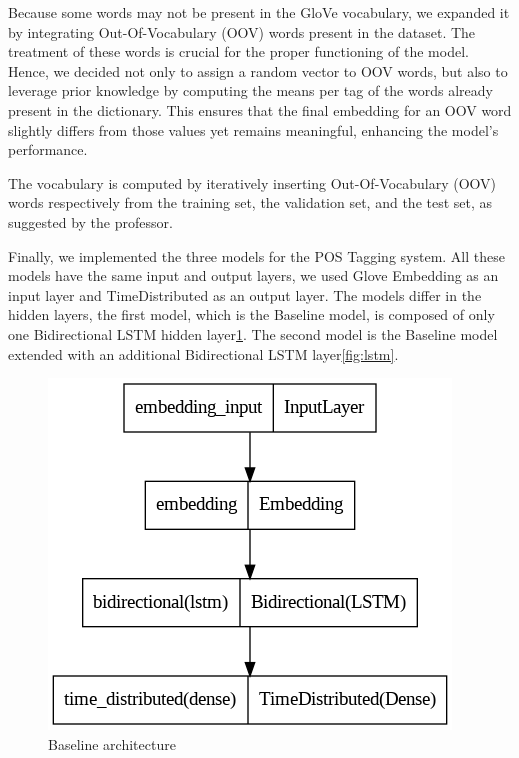\documentclass[11pt]{article}
\begin{document}
Because some words may not be present in the GloVe vocabulary, we expanded it by integrating Out-Of-Vocabulary (OOV) words present in the dataset. The treatment of these words is crucial for the proper functioning of the model. Hence, we decided not only to assign a random vector to OOV words, but also to leverage prior knowledge by computing the means per tag of the words already present in the dictionary. This ensures that the final embedding for an OOV word slightly differs from those values yet remains meaningful, enhancing the model's performance.

The vocabulary is computed by iteratively inserting Out-Of-Vocabulary (OOV) words respectively from the training set, the validation set, and the test set, as suggested by the professor.

Finally, we implemented the three models for the POS Tagging system. All these models have the same input and output layers, we used Glove Embedding as an input layer and TimeDistributed as an output layer.
The models differ in the hidden layers, the first model, which is the Baseline model, is composed of only one Bidirectional LSTM hidden layer\ref{fig:baseline}.
The second model is the Baseline model extended with an additional Bidirectional LSTM layer\ref{fig:lstm}.

\begin{figure}[hb]
    \centering
    \includegraphics[scale=0.5]{img/Baseline.png}
    \caption{Baseline architecture}
    \label{fig:baseline}
\end{figure}
\end{document}
